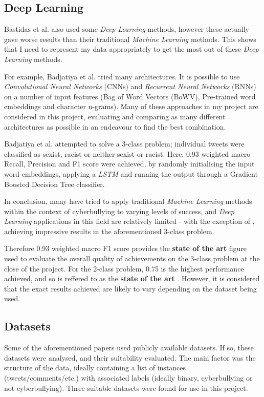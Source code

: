 \documentclass[12pt,a4paper]{article}
\begin{document}
\subsection{Deep Learning}
Bastidas et al. \citeyear[p.3]{Hack} also used some \textit{Deep Learning} methods, however these actually gave worse results than their traditional \textit{Machine Learning} methods. This shows that I need to represent my data appropriately to get the most out of these \textit{Deep Learning} methods.

For example, Badjatiya et al. \cite{Badjatiya} tried many architectures. It is possible to use \textit{Convolutional Neural Networks} (CNNs) and \textit{Recurrent Neural Networks} (RNNs) on a number of input features (Bag of Word Vectors (BoWV), Pre-trained word embeddings and character n-grams). Many of these approaches in my project are considered in this project, evaluating and comparing as many different architectures as possible in an endeavour to find the best combination.

Badjatiya et al. \cite{Badjatiya} attempted to solve a 3-class problem; individual tweets were classified as sexist, racist or neither sexist or racist. Here, 0.93 weighted macro Recall, Precision and F1 score were achieved, by randomly initialising the input word embeddings, applying a \textit{LSTM} and running the output through a Gradient Boosted Decision Tree classifier. 

In conclusion, many have tried to apply traditional \textit{Machine Learning} methods within the context of cyberbullying to varying levels of success, and \textit{Deep Learning} applications in this field are relatively limited - with the exception of \cite{Badjatiya}, achieving impressive results in the aforementioned 3-class problem. 

Therefore 0.93 weighted macro F1 score provides the \textbf{state of the art} figure used to evaluate the overall quality of achievements on the 3-class problem at the close of the project. For the 2-class problem, 0.75 is the highest performance achieved, and so is reffered to as the \textbf{state of the art} \cite{Hack}. However, it is considered that the exact results achieved are likely to vary depending on the dataset being used.


\subsection{Datasets}
Some of the aforementioned papers used publicly available datasets. If so, these datasets were analysed, and their suitability evaluated. The main factor was the structure of the data, ideally containing a list of instances (tweets/comments/etc.) with associated labels (ideally binary, cyberbullying or not cyberbullying). Three suitable datasets were found for use in this project.
\end{document}
